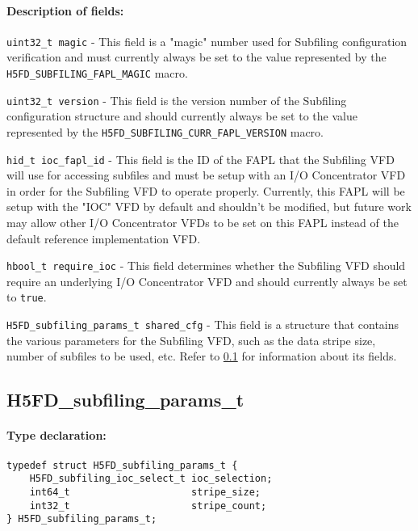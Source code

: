 \documentclass[../main.tex]{subfiles}
\begin{document}
\paragraph{Description of fields:}
\begin{flushleft}%
\texttt{uint32\_t magic} - This field is a "magic" number used for Subfiling configuration
verification and must currently always be set to the value represented by the
\texttt{H5FD\_SUBFILING\_FAPL\_MAGIC} macro.

\texttt{uint32\_t version} - This field is the version number of the Subfiling configuration
structure and should currently always be set to the value represented by the
\texttt{H5FD\_SUBFILING\_CURR\_FAPL\_VERSION} macro.

\texttt{hid\_t ioc\_fapl\_id} - This field is the ID of the \Gls{FAPL} that the Subfiling VFD
will use for accessing subfiles and must be setup with an I/O Concentrator VFD in order for
the Subfiling VFD to operate properly. Currently, this FAPL will be setup with the "IOC" VFD
by default and shouldn't be modified, but future work may allow other I/O Concentrator VFDs to
be set on this FAPL instead of the default reference implementation VFD.

\texttt{hbool\_t require\_ioc} - This field determines whether the Subfiling VFD should require
an underlying I/O Concentrator VFD and should currently always be set to \texttt{true}.

\texttt{H5FD\_subfiling\_params\_t shared\_cfg} - This field is a structure that contains the
various parameters for the Subfiling VFD, such as the data stripe size, number of subfiles to
be used, etc. Refer to \ref{ref:h5fd_subfiling_params_t} for information about its fields.
\end{flushleft}%

\newpage

\subsection{H5FD\_subfiling\_params\_t}
\label{ref:h5fd_subfiling_params_t}

\paragraph{Type declaration:}
\begin{flushleft}%
\begin{verbatim}
typedef struct H5FD_subfiling_params_t {
    H5FD_subfiling_ioc_select_t ioc_selection;
    int64_t                     stripe_size;
    int32_t                     stripe_count;
} H5FD_subfiling_params_t;
\end{verbatim}
\end{flushleft}%
\end{document}
